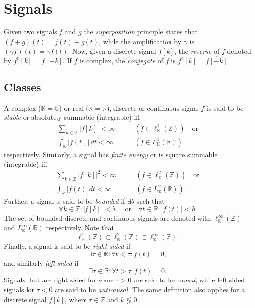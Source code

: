 
\section{Signals}

Given two signals $f$ and $g$ the \emph{superposition} principle states that
$(f+g)(t) = f(t) + g(t)$, while the amplification by $\gamma$ is $(\gamma
f)(t) = \gamma f(t)$. Now, given a discrete signal $f[k]$, the \emph{reverse}
of $f$ denoted by $f^r[k] = f[-k]$. If $f$ is complex, the \emph{conjugate} of
$f$ is $f^c[k] = \overline{f[-k]}$.

\subsection{Classes}

A complex ($\mathbb{K}=\mathbb{C}$) or real ($\mathbb{K}=\mathbb{R}$),
discrete or continuous signal $f$ is said to be \emph{stable} or absolutely
summable (integrable) iff
\begin{align*}
	\sum_{k \in \mathbb{Z}} |f[k]| < \infty
		& \qquad (f\in\ell^1_\mathbb{K}(\mathbb{Z})) \quad\text{or} \\
	\int_\mathbb{R} |f(t)| \,dt < \infty 
		& \qquad (f \in L^1_\mathbb{K}(\mathbb{R}))
\end{align*}
respectively. Similarly, a signal has \emph{finite energy} or is square
summable (integrable) iff
\begin{align*}
	\sum_{k \in \mathbb{Z}} |f[k]|^2 < \infty
		& \qquad (f\in\ell^2_\mathbb{K}(\mathbb{Z})) \quad\text{or} \\
	\int_\mathbb{R} |f(t)| \,dt < \infty 
		& \qquad (f \in L^2_\mathbb{K}(\mathbb{R})).
\end{align*}
Further, a signal is said to be \emph{bounded} if $\exists b$ such that
\[
	\forall k \in \mathbb{Z} : |f[k]| < b,
	\quad\text{or}\quad
	\forall t \in \mathbb{R} : |f(t)| < b.
\]
The set of bounded discrete and continuous signals are denoted with
$\ell^\infty_\mathbb{K}(\mathbb{Z})$ and $L^\infty_\mathbb{K}(\mathbb{R})$
respectively. Note that
\[
	\ell^1_\mathbb{K}(\mathbb{Z}) \subset
	\ell^2_\mathbb{K}(\mathbb{Z}) \subset
	\ell^\infty_\mathbb{K}(\mathbb{Z}).
\]
Finally, a signal is said to be \emph{right sided} if
\[
	\exists \tau \in \mathbb{R} : \forall t < \tau : f(t) = 0,
\]
and similarly \emph{left sided} if 
\[
	\exists \tau \in \mathbb{R} : \forall t > \tau : f(t) = 0.
\]
Signals that are right sided for some $\tau > 0$ are said to be \emph{causal},
while left sided signals for $\tau < 0$ are said to be \emph{anticausal}. The
same definition also applies for a discrete signal $f[k]$, where $\tau \in
\mathbb{Z}$ and $k \lessgtr 0$.

